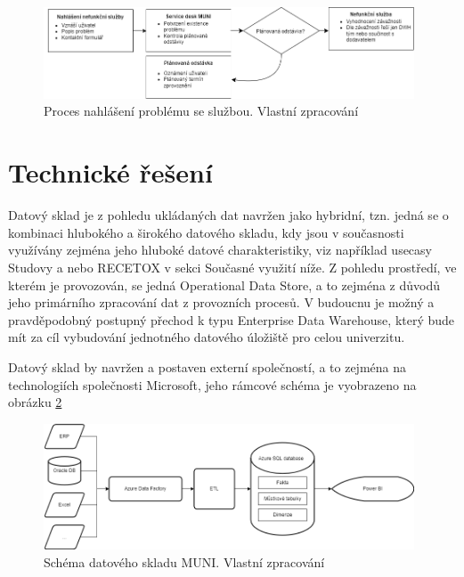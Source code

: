 \documentclass[
  digital,     %
  twoside,     %
  lof,         %
  lot,         %
]{fithesis4}
\begin{document}
    \begin{figure}[t]
        \begin{center}
            \includegraphics[width=11cm]{img/service_failure_process.png}
        \end{center}
        \caption{Proces nahlášení problému se službou. Vlastní zpracování}
        \label{fig:service_fail}
    \end{figure} 
    
\section{Technické řešení}
Datový sklad je z pohledu ukládaných dat navržen jako hybridní, tzn. jedná se o kombinaci hlubokého a širokého datového skladu, kdy jsou v současnosti využívány zejména jeho hluboké datové charakteristiky, viz například usecasy Studovy a nebo RECETOX v sekci Současné využití níže. Z pohledu prostředí, ve kterém je provozován, se jedná Operational Data Store, a to zejména z důvodů jeho primárního zpracování dat z provozních procesů. V budoucnu je možný a pravděpodobný postupný přechod k typu Enterprise Data Warehouse, který bude mít za cíl vybudování jednotného datového úložiště pro celou univerzitu.

Datový sklad by navržen a postaven externí společností, a to zejména na technologiích společnosti Microsoft, jeho rámcové schéma je vyobrazeno na obrázku \ref{fig:dwh_muni}

    \begin{figure}[t]
        \begin{center}
            \includegraphics[width=11cm]{img/dwh_muni.png}
        \end{center}
        \caption{Schéma datového skladu MUNI. Vlastní zpracování}
        \label{fig:dwh_muni}
    \end{figure} 
    
\end{document}
